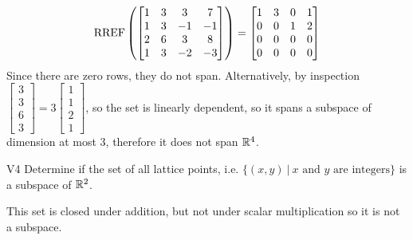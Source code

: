 \documentclass{sbgLAsemi}
\begin{document}
\begin{solution}
$$\operatorname{RREF}\left(\begin{bmatrix} 1 & 3 & 3 & 7 \\ 1 & 3 & -1 & -1 \\ 2 & 6 & 3 & 8 \\ 1 & 3 & -2 & -3 \end{bmatrix}\right) = \begin{bmatrix} 1 & 3 & 0 & 1 \\ 0 & 0 & 1 & 2 \\ 0 & 0 & 0 & 0 \\ 0 & 0 & 0 & 0  \end{bmatrix}$$
Since there are zero rows, they do not span.  Alternatively, by inspection $\begin{bmatrix} 3 \\ 3 \\ 6 \\ 3 \end{bmatrix}=3\begin{bmatrix} 1 \\ 1 \\ 2 \\1 \end{bmatrix}$, so the set is linearly dependent, so it spans a subspace of dimension at most 3, therefore it does not span $\mathbb{R}^4$.
\end{solution}

\begin{problem}{V4}
Determine if the set of all lattice points, i.e. $\{(x,y)\ \big|\ \text{$x$ and $y$ are integers} \}$ is a subspace of $\mathbb{R}^2$.
\end{problem}
\begin{solution}
This set is closed under addition, but not under scalar multiplication so it is not a subspace.
\end{solution}
\end{document}
